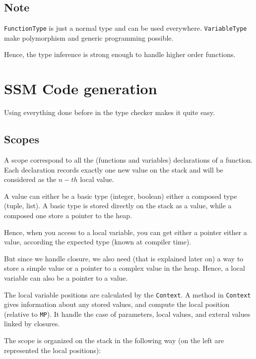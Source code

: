 \documentclass{article}
\newcommand\cc[1]{\lstinline{#1}}
\begin{document}
		\subsection{Note}
			\cc{FunctionType} is just a normal type and can be used everywhere. \cc{VariableType} make polymorphism and generic programming possible.

			Hence, the type inference is strong enough to handle higher order functions.
	\section{SSM Code generation}
		Using everything done before in the type checker makes it quite easy.
		\subsection{Scopes}
			A scope correspond to all the (functions and variables) declarations of a function. Each declaration records exactly one new value on the stack and will be considered as the $n-th$ local value. 

			A value can either be a basic type (integer, boolean) either a composed type (tuple, list). A basic type is stored directly on the stack as a value, while a composed one store a pointer to the heap.

			Hence, when you access to a local variable, you can get either a pointer either a value, according the expected type (known at compiler time).

			But since we handle closure, we also need (that is explained later on) a way to store a simple value or a pointer to a complex value in the heap. Hence, a local variable can also be a pointer to a value.    

			The local variable positions are calculated by the \cc{Context}. A method in \cc{Context} gives information about any stored values, and compute the local position (relative to \texttt{MP}). It handle the case of parameters, local values, and exteral values linked by closures.

			The scope is organized on the stack in the following way (on the left are represented the local positions):
\end{document}
